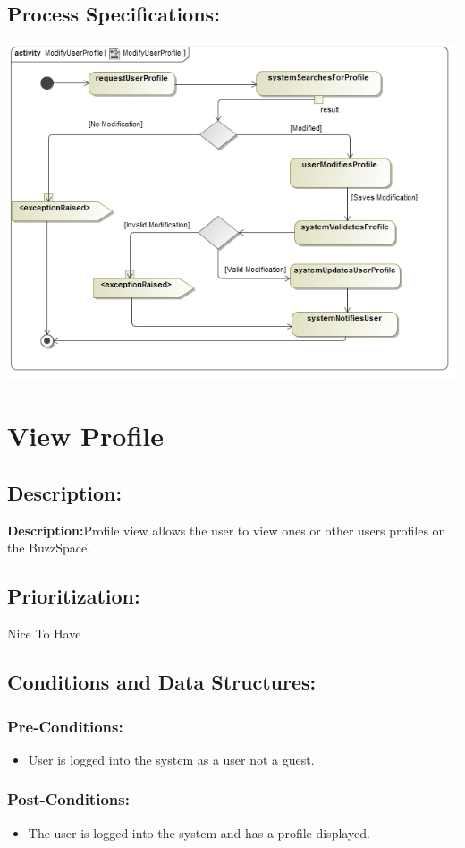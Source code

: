 \documentclass[a4paper,11pt]{article}
\begin{document}
\subsection{Process Specifications:} 
\includegraphics[width=1\linewidth]{./Images/UserProfile/ModifyUserProfileActivity}


\section{View Profile}
\subsection*{Description:}
\textbf{Description:}Profile view allows the user to view ones or other users profiles on the BuzzSpace.
\subsection{Prioritization:} 
\textbf{}Nice To Have
\subsection{Conditions and Data Structures:}
\subsubsection*{Pre-Conditions:}
\begin{itemize}
\item User is logged into the system as a user not a guest. 
\end{itemize}
\subsubsection*{Post-Conditions:}
\begin{itemize}
\item The user is logged into the system and has a profile displayed.
\end{itemize}
\end{document}
